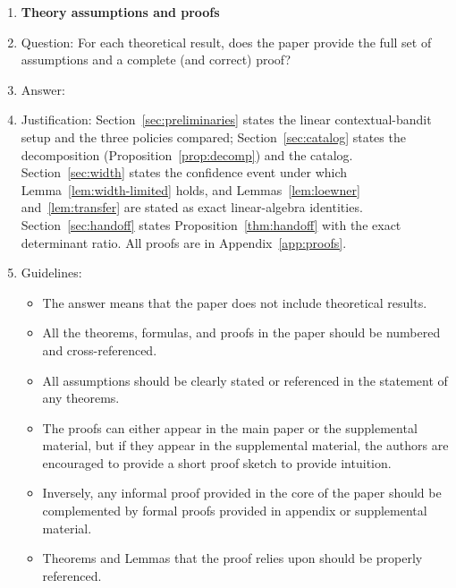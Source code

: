 \documentclass{article}
\theoremstyle{definition}
\theoremstyle{remark}
\theoremstyle{remark}
\begin{document}
\begin{enumerate}
\begin{itemize}
        \item The authors should discuss the computational efficiency of the proposed algorithms and how they scale with dataset size.
        \item If applicable, the authors should discuss possible limitations of their approach to address problems of privacy and fairness.
        \item While the authors might fear that complete honesty about limitations might be used by reviewers as grounds for rejection, a worse outcome might be that reviewers discover limitations that aren't acknowledged in the paper. The authors should use their best judgment and recognize that individual actions in favor of transparency play an important role in developing norms that preserve the integrity of the community. Reviewers will be specifically instructed to not penalize honesty concerning limitations.
    \end{itemize}

\item {\bf Theory assumptions and proofs}
    \item[] Question: For each theoretical result, does the paper provide the full set of assumptions and a complete (and correct) proof?
    \item[] Answer: \answerYes{} %
    \item[] Justification: Section~\ref{sec:preliminaries} states the linear contextual-bandit setup and the three policies compared; Section~\ref{sec:catalog} states the decomposition (Proposition~\ref{prop:decomp}) and the catalog. Section~\ref{sec:width} states the confidence event under which Lemma~\ref{lem:width-limited} holds, and Lemmas~\ref{lem:loewner} and~\ref{lem:transfer} are stated as exact linear-algebra identities. Section~\ref{sec:handoff} states Proposition~\ref{thm:handoff} with the exact determinant ratio. All proofs are in Appendix~\ref{app:proofs}.
    \item[] Guidelines:
    \begin{itemize}
        \item The answer \answerNA{} means that the paper does not include theoretical results. 
        \item All the theorems, formulas, and proofs in the paper should be numbered and cross-referenced.
        \item All assumptions should be clearly stated or referenced in the statement of any theorems.
        \item The proofs can either appear in the main paper or the supplemental material, but if they appear in the supplemental material, the authors are encouraged to provide a short proof sketch to provide intuition. 
        \item Inversely, any informal proof provided in the core of the paper should be complemented by formal proofs provided in appendix or supplemental material.
        \item Theorems and Lemmas that the proof relies upon should be properly referenced. 
    \end{itemize}


\end{enumerate}
\end{document}
